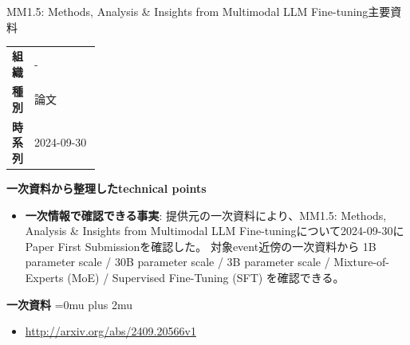 \begin{technicalnote}{MM1.5: Methods, Analysis \& Insights from Multimodal LLM Fine-tuning}{主要資料}
\begingroup
\begin{tabularx}{\linewidth}{@{}>{\bfseries}p{0.22\linewidth}X@{}}
組織 & - \\
種別 & 論文 \\
時系列 & 2024-09-30 \\
\end{tabularx}
\smallskip
{\bfseries 一次資料から整理したtechnical points}
\begin{itemize}[leftmargin=1.5em,itemsep=0.35em]
\item \textbf{一次情報で確認できる事実}: 提供元の一次資料により、MM1.5: Methods, Analysis \& Insights from Multimodal LLM Fine-tuningについて2024-09-30にPaper First Submissionを確認した。 対象event近傍の一次資料から 1B parameter scale / 30B parameter scale / 3B parameter scale / Mixture-of-Experts (MoE) / Supervised Fine-Tuning (SFT) を確認できる。
\end{itemize}
\begin{minipage}{\linewidth}
\begin{samepage}
{\bfseries 一次資料}
\begingroup\sloppy
\Urlmuskip=0mu plus 2mu\relax
\begin{itemize}[leftmargin=1.5em,itemsep=0.25em]
\item {\scriptsize\url{http://arxiv.org/abs/2409.20566v1}}
\end{itemize}
\endgroup
\end{samepage}
\end{minipage}
\endgroup
\end{technicalnote}
\medskip

